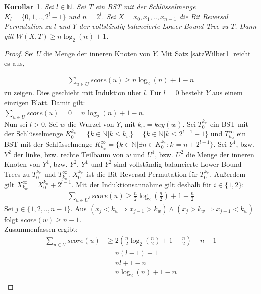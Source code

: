 \documentclass[a4paper,12pt]{article}
\begin{document}
\newtheorem{Korollar1}{Korollar}[section]
\begin{Korollar1} Sei $l \in \mathbb{N}$. Sei $T$ ein BST mit der Schlüsselmenge\\ ${K_l = \{0,1,..,2^l -1\}}$ und $n = 2^l$. Sei $X = x_0, x_1,..,x_{n-1}$ die Bit Reversal Permutation zu $l$ und $Y$ der vollständig balancierte Lower Bound Tree zu $T$. Dann gilt  $W\left(X,T\right) \geq n \log_2 \left(n\right) + 1 $. 
\end{Korollar1}
\begin{proof}
	Sei $U$ die Menge der inneren Knoten von $Y$. Mit Satz \ref{satzWilber1} reicht es aus, 
	
	\begin{align*}
	\sum_{u \in U} {\mathit{score}\left(u\right)} \geq n \log_2\left( n\right) + 1 - n 
	\end{align*} 
	zu zeigen. Dies geschieht mit Induktion über $l$. Für $l = 0$ besteht $Y$ aus einem einzigen Blatt. Damit gilt:\\ $ \sum_{u \in U} {\mathit{score}\left(u\right)} = 0 = n \log_2 \left(n\right) + 1 - n $. \\
	Nun sei $l > 0$. Sei $w$ die Wurzel von $Y$, mit $k_w = \mathit{key}(w)$. Sei $T_0^{k_w}$ ein BST mit der Schlüsselmenge $K_0^{k_w} =\{k \in \mathbb{N}\vert k \leq k_w\} = \{k \in \mathbb{N}\vert k \leq 2^{l-1} - 1\}$ und $T_{k_w}^\infty$ ein BST mit der Schlüsselmenge \mbox{$ K^\infty_{k_w} = \{k \in \mathbb{N}\vert \exists n \in K_0^{k_w}\colon  k = n + 2^{l-1}\}$}. Sei $Y^1$, bzw. $Y^2$ der linke, bzw. rechte Teilbaum von $w$ und $U^1$, bzw. $U^2$ die Menge der inneren Knoten von $Y^1$, bzw. $Y^2$. $Y^1$ und $Y^2$ sind vollständig balancierte Lower Bound Trees zu $T_0^{k_w}$ und $T_{k_w}^\infty$. $X^{k_w}_0$ ist die Bit Reversal Permutation für $T_0^{k_w}$. Außerdem gilt $X_{k_w}^\infty = X^{k_w}_0 + 2^{l-1}$. Mit der Induktionsannahme gilt deshalb für $i \in \{1,2\}$:
	\begin{align*}
	\sum_{u \in U^i} {\mathit{score}\left(u\right)} \geq  \frac{n}{2} \log_2 \left(\frac{n}{2} \right) + 1 - \frac{n}{2}  
	\end{align*}
	Sei $j \in \{1, 2,.., n-1\}$. Aus $\left(x_j < k_w \Rightarrow x_{j-1} > k_w \right) \land \left(x_j > k_w \Rightarrow x_{j-1} < k_w \right)$ folgt $\mathit{score}\left(w\right) \geq n-1$. \\
	Zusammenfassen ergibt:
	\begin{align*}
	\sum_{u \in U} {\mathit{score}\left(u\right)} &\geq 2 \left( \frac{n}{2}  \log_2 \left(\frac{n}{2} \right) + 1 - \frac{n}{2} \right) + n - 1\\	
	&= n (l-1)  + 1 \\	
	&= n l + 1 -n \\
	&= n \log_2\left( n\right) + 1 - n\\	
	\end{align*}
	
\end{proof}
\end{document}
